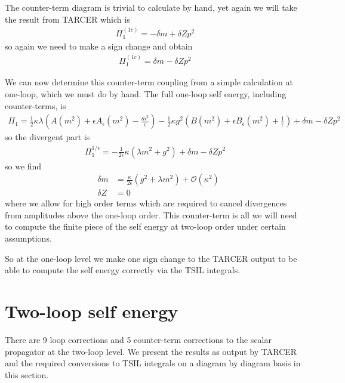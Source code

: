 \documentclass[11pt]{article}
\newcommand{\tsil}{\textsf{TSIL} \! }
\newcommand{\tarcer}{\textsf{TARCER} \! }
\begin{document}
The counter-term diagram is trivial to calculate by hand, yet again we will take the result from \tarcer which is
\begin{align}
\Pi^{(1c)}_1 =  -\delta m + \delta Z p^2
\end{align}
so again we need to make a sign change and obtain
\begin{align}
\Pi^{(1c)}_1=  \delta m - \delta Z p^2
\end{align}


We can now determine this counter-term coupling from a simple calculation at one-loop, which we must do by hand.  The full one-loop self energy, including counter-terms, is
 \begin{align}
 \Pi_1 = \frac{1}{2}\kappa\lambda\left(A(m^2)+\epsilon A_{\epsilon}(m^2)-\frac{m^2}{\epsilon}\right)- \frac{1}{2}\kappa g^2\left(B(m^2)+\epsilon B_{\epsilon}(m^2)+\frac{1}{\epsilon}\right)+ \delta m - \delta Z p^2
 \end{align}
so the divergent part is
\begin{align}
\Pi_1^{1/\epsilon}=  -\frac{1}{2\epsilon}\kappa\left(\lambda m^2+g^2\right)+ \delta m - \delta Z p^2
\end{align}
so we find
\begin{eqnarray}
&\delta m &=\frac{\kappa}{2\epsilon} \left(g^2+\lambda m^2\right)+\mathcal{O}(\kappa^2)\\
&\delta Z &= 0
\end{eqnarray}
where we allow for high order terms which are required to cancel divergences from amplitudes above the one-loop order.  This counter-term is all we will need to compute the finite piece of the self energy at two-loop order under certain assumptions.

So at the one-loop level we make one sign change to the \tarcer output to be able to compute the self energy correctly via the \tsil integrals.

\section{Two-loop self energy}

There are 9 loop corrections and 5 counter-term corrections to the scalar propagator at the two-loop level.  We present the results as output by \tarcer and the required conversions to \tsil integrals on a diagram by diagram basis in this section.
\end{document}
